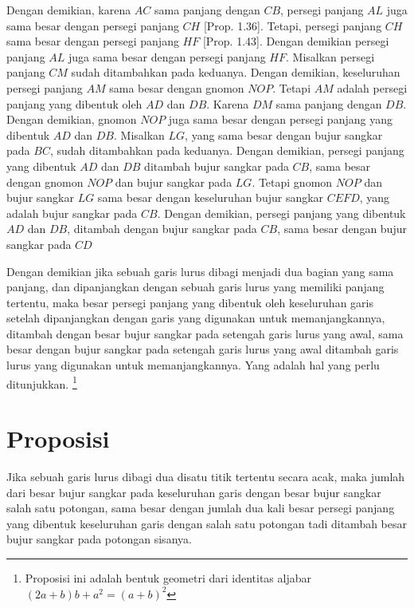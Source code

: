 \documentclass[a4paper]{book}
\begin{document}
Dengan demikian, karena $AC$ sama panjang dengan $CB$, persegi panjang $AL$ 
juga sama besar dengan persegi panjang $CH$ [Prop. 1.36]. Tetapi, persegi
panjang $CH$ sama besar dengan persegi panjang $HF$ [Prop. 1.43]. Dengan 
demikian persegi panjang $AL$ juga sama besar dengan persegi panjang $HF$.
Misalkan persegi panjang $CM$ sudah ditambahkan pada keduanya. Dengan demikian,
keseluruhan persegi panjang $AM$ sama besar dengan gnomon $NOP$.  Tetapi $AM$
adalah persegi panjang yang dibentuk oleh $AD$ dan $DB$. Karena $DM$ sama 
panjang dengan $DB$. Dengan demikian, gnomon $NOP$ juga sama besar dengan 
persegi panjang yang dibentuk $AD$  dan $DB$. Misalkan $LG$, yang 
sama besar dengan bujur sangkar pada $BC$, sudah ditambahkan pada keduanya.
Dengan demikian, persegi panjang yang dibentuk $AD$ dan $DB$ ditambah bujur
sangkar pada $CB$, sama besar dengan gnomon $NOP$ dan bujur sangkar pada
$LG$. Tetapi gnomon $NOP$ dan bujur sangkar $LG$ sama besar dengan keseluruhan
bujur sangkar $CEFD$, yang adalah bujur sangkar pada $CB$. Dengan demikian,
persegi panjang yang dibentuk $AD$ dan $DB$, ditambah dengan bujur sangkar 
pada $CB$, sama besar dengan bujur sangkar pada $CD$

Dengan demikian jika sebuah garis lurus dibagi menjadi dua bagian yang sama 
panjang, dan dipanjangkan dengan sebuah garis lurus yang memiliki panjang tertentu, 
maka besar persegi panjang yang dibentuk oleh keseluruhan garis setelah dipanjangkan 
 dengan garis yang digunakan untuk memanjangkannya, ditambah dengan besar bujur 
sangkar pada setengah garis lurus yang awal, sama besar dengan bujur sangkar 
pada setengah garis lurus yang awal ditambah garis lurus yang 
digunakan untuk memanjangkannya. Yang adalah hal yang perlu ditunjukkan.
\footnote{Proposisi ini adalah bentuk
geometri dari identitas aljabar $(2a + b)b + a^2 = (a + b)^2 $ }

\section*{\centering Proposisi \thesection} 

Jika sebuah garis lurus dibagi dua disatu titik tertentu secara acak, maka jumlah
dari besar bujur sangkar pada keseluruhan garis dengan besar bujur sangkar salah satu 
potongan, sama besar dengan jumlah dua kali besar persegi panjang yang dibentuk
keseluruhan garis dengan salah satu potongan tadi ditambah besar bujur sangkar pada potongan
sisanya.
\end{document}
